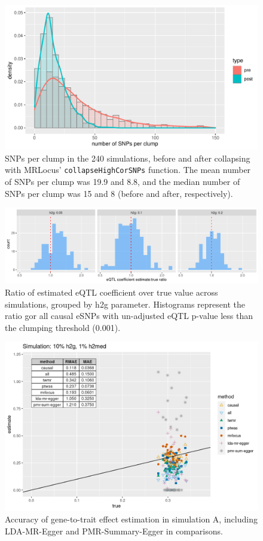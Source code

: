 \documentclass[11pt]{article}
\begin{document}
\begin{figure}[!ht]
  \centering
  \includegraphics[width=.7\textwidth]{figs/snps_per_clump}
  \caption{SNPs per clump in the 240 simulations, before and after
    collapsing with MRLocus’ \texttt{collapseHighCorSNPs}
    function. The mean number of SNPs per clump was 19.9 and 8.8, and
    the median number of SNPs per clump was 15 and 8 (before and
    after, respectively).}
\end{figure}

\begin{figure}[!ht]
  \centering
  \includegraphics[width=\textwidth]{figs/sim_overest}
  \caption{Ratio of estimated eQTL coefficient over true value across
    simulations, grouped by h2g parameter. Histograms represent the
    ratio gor all causal eSNPs with un-adjusted eQTL p-value less than
    the clumping threshold (0.001).}
\end{figure}

\begin{figure}[!ht]
  \centering
  \includegraphics[width=.7\textwidth]{figs/sim1extra2.png}
  \caption{Accuracy of gene-to-trait effect estimation in simulation
    A, including LDA-MR-Egger and PMR-Summary-Egger in
    comparisons.}
\end{figure}
\end{document}
